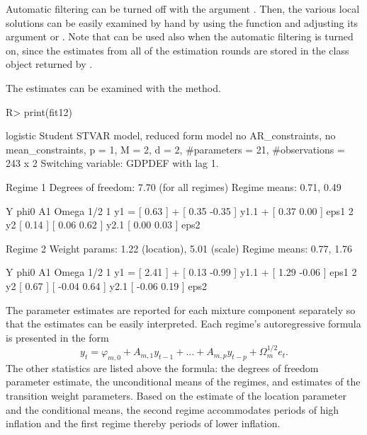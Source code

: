 \documentclass[nojss]{jss}
\begin{document}
Automatic filtering can be turned off with the argument . Then, the various local solutions can be easily examined by hand by using the function  and adjusting its argument  or . Note that  can be used also when the automatic filtering is turned on, since the estimates from all of the estimation rounds are stored in the class  object returned by .

The estimates can be examined with the  method.
%
\begin{CodeChunk}
\begin{CodeInput}
R> print(fit12)
\end{CodeInput}
\begin{CodeOutput}
logistic Student STVAR model, reduced form model no AR_constraints, no mean_constraints,
  p = 1, M = 2, d = 2, #parameters = 21, #observations = 243 x 2
  Switching variable: GDPDEF with lag 1.

Regime 1
Degrees of freedom: 7.70 (for all regimes)
Regime means: 0.71, 0.49

   Y     phi0          A1                  Omega        1/2
1 y1 = [ 0.63 ] + [  0.35 -0.35 ] y1.1 + [  0.37 0.00 ]     eps1
2 y2   [ 0.14 ]   [  0.06  0.62 ] y2.1   [  0.00 0.03 ]     eps2

Regime 2
Weight params: 1.22 (location), 5.01 (scale)
Regime means: 0.77, 1.76

   Y     phi0          A1                  Omega         1/2
1 y1 = [ 2.41 ] + [  0.13 -0.99 ] y1.1 + [  1.29 -0.06 ]     eps1
2 y2   [ 0.67 ]   [ -0.04  0.64 ] y2.1   [ -0.06  0.19 ]     eps2
\end{CodeOutput}
\end{CodeChunk}
%
The parameter estimates are reported for each mixture component separately so that the estimates can be easily interpreted. Each regime's autoregressive formula is presented in the form
\begin{equation}
y_t = \varphi_{m,0} + A_{m,1}y_{t - 1} + ... + A_{m,p}y_{t - p} + \Omega_{m}^{1/2}e_{t}.
\end{equation}
The other statistics are listed above the formula: the degrees of freedom parameter estimate, the unconditional means of the regimes, and estimates of the transition weight parameters. Based on the estimate of the location parameter and the conditional means, the second regime accommodates periods of high inflation and the first regime thereby periods of lower inflation.
\end{document}
